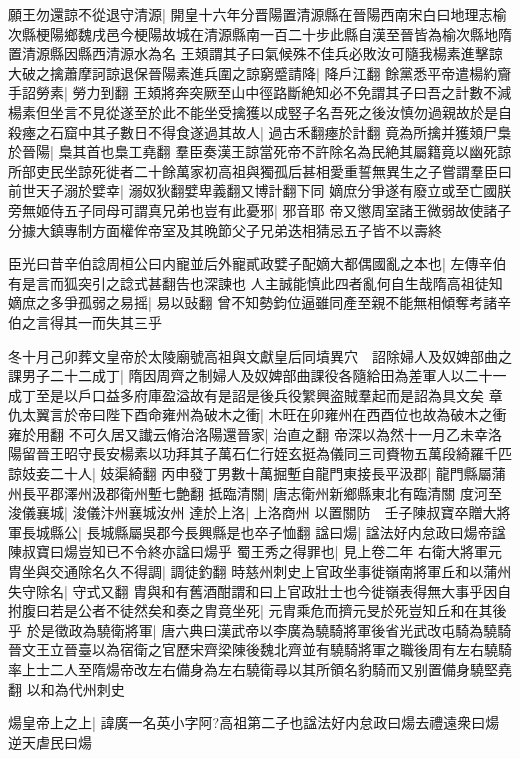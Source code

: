 願王勿還諒不從退守清源|{
	開皇十六年分晋陽置清源縣在晉陽西南宋白曰地理志榆次縣梗陽鄉魏戌邑今梗陽故城在清源縣南一百二十步此縣自漢至晉皆為榆次縣地隋置清源縣因縣西清源水為名}
王頍謂其子曰氣候殊不佳兵必敗汝可隨我楊素進擊諒大破之擒蕭摩訶諒退保晉陽素進兵圍之諒窮蹙請降|{
	降戶江翻}
餘黨悉平帝遣楊約齎手詔勞素|{
	勞力到翻}
王頍將奔突厥至山中徑路斷絶知必不免謂其子曰吾之計數不減楊素但坐言不見從遂至於此不能坐受擒獲以成竪子名吾死之後汝慎勿過親故於是自殺瘞之石窟中其子數日不得食遂過其故人|{
	過古禾翻瘞於計翻}
竟為所擒并獲頍尸梟於晉陽|{
	梟其首也梟工堯翻}
羣臣奏漢王諒當死帝不許除名為民絶其屬籍竟以幽死諒所部吏民坐諒死徙者二十餘萬家初高祖與獨孤后甚相愛重誓無異生之子嘗謂羣臣曰前世天子溺於嬖幸|{
	溺奴狄翻嬖卑義翻又博計翻下同}
嫡庶分爭遂有廢立或至亡國朕旁無姬侍五子同母可謂真兄弟也豈有此憂邪|{
	邪音耶}
帝又懲周室諸王微弱故使諸子分據大鎮專制方面權侔帝室及其晩節父子兄弟迭相猜忌五子皆不以壽終

臣光曰昔辛伯諗周桓公曰内寵並后外寵貳政嬖子配嫡大都偶國亂之本也|{
	左傳辛伯有是言而狐突引之諗式甚翻告也深諫也}
人主誠能慎此四者亂何自生哉隋高祖徒知嫡庶之多爭孤弱之易摇|{
	易以䜴翻}
曾不知勢鈞位逼雖同產至親不能無相傾奪考諸辛伯之言得其一而失其三乎

冬十月己卯葬文皇帝於太陵廟號高祖與文獻皇后同墳異穴　詔除婦人及奴婢部曲之課男子二十二成丁|{
	隋因周齊之制婦人及奴婢部曲課役各隨給田為差軍人以二十一成丁至是以戶口益多府庫盈溢故有是詔是後兵役䌓興盗賊羣起而是詔為具文矣}
章仇太翼言於帝曰陛下酉命雍州為破木之衝|{
	木旺在卯雍州在西酉位也故為破木之衝雍於用翻}
不可久居又䜟云脩治洛陽還晉家|{
	治直之翻}
帝深以為然十一月乙未幸洛陽留晉王昭守長安楊素以功拜其子萬石仁行姪玄挺為儀同三司賚物五萬段綺羅千匹諒妓妾二十人|{
	妓渠綺翻}
丙申發丁男數十萬掘塹自龍門東接長平汲郡|{
	龍門縣屬蒲州長平郡澤州汲郡衛州塹七艶翻}
抵臨清關|{
	唐志衛州新鄉縣東北有臨清關}
度河至浚儀襄城|{
	浚儀汴州襄城汝州}
達於上洛|{
	上洛商州}
以置關防　壬子陳叔寶卒贈大將軍長城縣公|{
	長城縣屬吳郡今長興縣是也卒子恤翻}
諡曰煬|{
	諡法好内怠政曰煬帝諡陳叔寶曰煬豈知已不令終亦諡曰煬乎}
蜀王秀之得罪也|{
	見上卷二年}
右衛大將軍元胄坐與交通除名久不得調|{
	調徒釣翻}
時慈州刺史上官政坐事徙嶺南將軍丘和以蒲州失守除名|{
	守式又翻}
胄與和有舊酒酣謂和曰上官政壯士也今徙嶺表得無大事乎因自拊腹曰若是公者不徒然矣和奏之胄竟坐死|{
	元胄乘危而擠元旻於死豈知丘和在其後乎}
於是徵政為驍衛將軍|{
	唐六典曰漢武帝以李廣為驍騎將軍後省光武改屯騎為驍騎晉文王立晉臺以為宿衛之官歷宋齊梁陳後魏北齊並有驍騎將軍之職後周有左右驍騎率上士二人至隋煬帝改左右備身為左右驍衛尋以其所領名豹騎而又别置備身驍堅堯翻}
以和為代州刺史

煬皇帝上之上|{
	諱廣一名英小字阿?高祖第二子也諡法好内怠政曰煬去禮遠衆曰煬逆天虐民曰煬}


